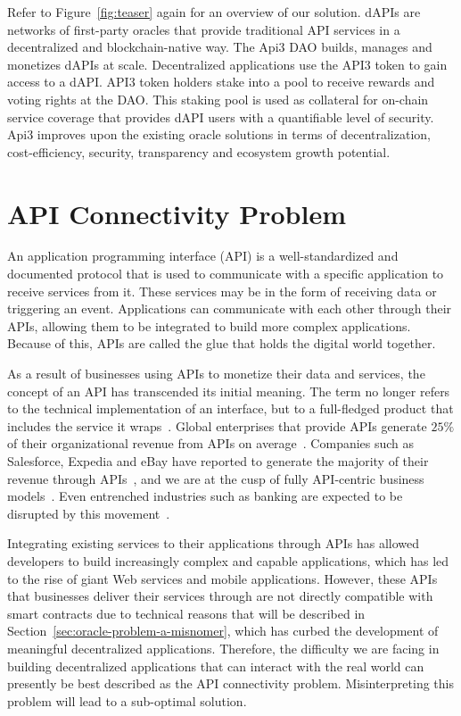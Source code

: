 \documentclass[11pt]{article}
\begin{document}
Refer to Figure~\ref{fig:teaser} again for an overview of our solution.
dAPIs are networks of first-party oracles that provide traditional API services in a decentralized and blockchain-native way.
The Api3 DAO builds, manages and monetizes dAPIs at scale.
Decentralized applications use the API3 token to gain access to a dAPI.
API3 token holders stake into a pool to receive rewards and voting rights at the DAO.
This staking pool is used as collateral for on-chain service coverage that provides dAPI users with a quantifiable level of security.
Api3 improves upon the existing oracle solutions in terms of decentralization, cost-efficiency, security, transparency and ecosystem growth potential.

\section{API Connectivity Problem}
\label{sec:api-connectivity-problem}

An application programming interface (API) is a well-standardized and documented protocol that is used to communicate with a specific application to receive services from it.
These services may be in the form of receiving data or triggering an event.
Applications can communicate with each other through their APIs, allowing them to be integrated to build more complex applications.
Because of this, APIs are called the glue that holds the digital world together.

As a result of businesses using APIs to monetize their data and services, the concept of an API has transcended its initial meaning.
The term no longer refers to the technical implementation of an interface, but to a full-fledged product that includes the service it wraps~\cite{deloitte:2015}.
Global enterprises that provide APIs generate $25\%$ of their organizational revenue from APIs on average~\cite{mulesoft:2019}.
Companies such as Salesforce, Expedia and eBay have reported to generate the majority of their revenue through APIs~\cite{iyer:2015}, and we are at the cusp of fully API-centric business models~\cite{ibm:2016}.
Even entrenched industries such as banking are expected to be disrupted by this movement~\cite{capgemini:2019a}.

Integrating existing services to their applications through APIs has allowed developers to build increasingly complex and capable applications, which has led to the rise of giant Web services and mobile applications.
However, these APIs that businesses deliver their services through are not directly compatible with smart contracts due to technical reasons that will be described in Section~\ref{sec:oracle-problem-a-misnomer}, which has curbed the development of meaningful decentralized applications.
Therefore, the difficulty we are facing in building decentralized applications that can interact with the real world can presently be best described as the API connectivity problem.
Misinterpreting this problem will lead to a sub-optimal solution.
\end{document}

